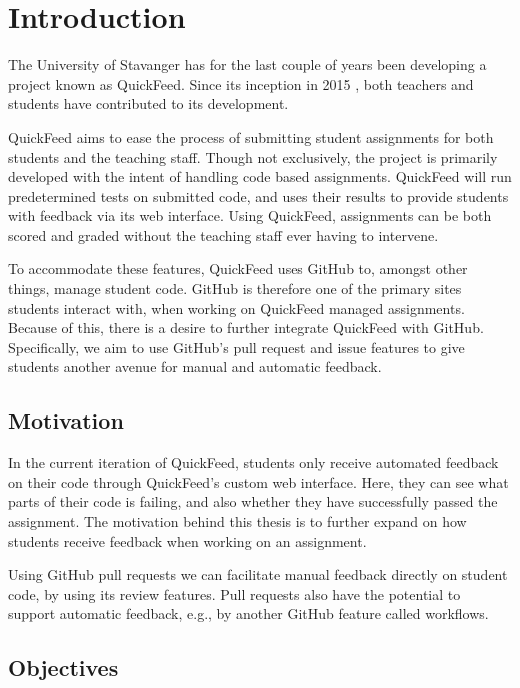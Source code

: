 
\chapter{Introduction}
\label{ch:intro}

The University of Stavanger has for the last couple of years been developing a project known as QuickFeed.
Since its inception in 2015 \cite{autograder}, both teachers and students have contributed to its development.

QuickFeed aims to ease the process of submitting student assignments for both students and the teaching staff.
Though not exclusively, the project is primarily developed with the intent of handling code based assignments.
QuickFeed will run predetermined tests on submitted code, and uses their results to provide students with feedback via its web interface.
Using QuickFeed, assignments can be both scored and graded without the teaching staff ever having to intervene.

To accommodate these features, QuickFeed uses GitHub to, amongst other things, manage student code.
GitHub is therefore one of the primary sites students interact with, when working on QuickFeed managed assignments.
Because of this, there is a desire to further integrate QuickFeed with GitHub.
Specifically, we aim to use GitHub's pull request and issue features to give students another avenue for manual and automatic feedback.

\section{Motivation}
\label{sec:motivation}

In the current iteration of QuickFeed, students only receive automated feedback on their code through QuickFeed's custom web interface.
Here, they can see what parts of their code is failing, and also whether they have successfully passed the assignment.
The motivation behind this thesis is to further expand on how students receive feedback when working on an assignment.

Using GitHub pull requests we can facilitate manual feedback directly on student code, by using its review features.
Pull requests also have the potential to support automatic feedback, e.g., by another GitHub feature called workflows.

\section{Objectives}

